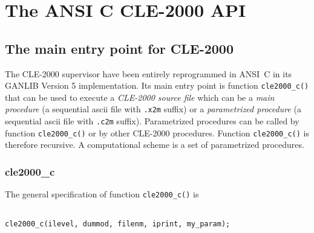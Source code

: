 \clearpage

\section {The ANSI C CLE-2000 API}\label{sect:cle2000apiC}

\subsection {The main entry point for CLE-2000}

The CLE-2000 supervisor have been entirely reprogrammed in ANSI~C in its GANLIB Version 5 implementation. Its main entry
point is function {\tt cle2000\_c()} that can be used to execute a {\sl CLE-2000 source file} which can be a {\sl main procedure}
(a sequential {\sc ascii} file with {\tt .x2m} suffix) or a {\sl parametrized procedure} (a sequential {\sc ascii} file with {\tt .c2m} suffix).
Parametrized procedures can be called by function {\tt cle2000\_c()} or by other CLE-2000 procedures. Function {\tt cle2000\_c()} is therefore 
recursive. A computational scheme is a set of parametrized procedures.

\subsubsection{cle2000\_c}

The general specification of function {\tt cle2000\_c()} is

\begin{verbatim}

cle2000_c(ilevel, dummod, filenm, iprint, my_param);
\end{verbatim}

\vskip 0.8cm


